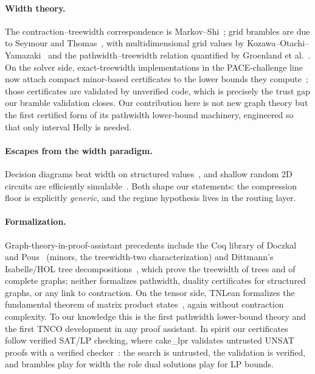 \documentclass[sigplan,10pt,screen,review,anonymous]{acmart}
\begin{document}
\paragraph{Width theory.} The contraction--treewidth correspondence is
Markov--Shi~\cite{markov2008simulating}; grid brambles are due to Seymour and
Thomas~\cite{seymour1993graph}, with multidimensional grid values by
Kozawa--Otachi--Yamazaki~\cite{kozawa2014treewidth} and the pathwidth--treewidth relation
quantified by Groenland et al.~\cite{groenland2023tight}. On the solver side, exact-treewidth
implementations in the PACE-challenge line now attach compact minor-based certificates to
the lower bounds they compute~\cite{tamaki2022heuristic}; those certificates are validated
by unverified code, which is precisely the trust gap our bramble validation closes. Our
contribution here is not new graph theory but the first certified form of its
pathwidth lower-bound machinery, engineered so that only interval Helly is
needed.

\paragraph{Escapes from the width paradigm.} Decision diagrams beat width on structured
values~\cite{dd2025treewidth}, and shallow random 2D circuits are efficiently
simulable~\cite{napp2022efficient}. Both shape our statements: the compression floor is
explicitly \emph{generic}, and the regime hypothesis lives in the routing layer.

\paragraph{Formalization.} Graph-theory-in-proof-assistant precedents include the Coq
library of Doczkal and Pous~\cite{doczkal2020graph} (minors, the treewidth-two
characterization) and Dittmann's Isabelle/HOL tree decompositions~\cite{dittmann2016tree},
which prove the treewidth of trees and of complete graphs; neither formalizes pathwidth,
duality certificates for structured graphs, or any link to contraction. On the tensor
side, TNLean formalizes the fundamental theorem of matrix product states~\cite{tnlean2026},
again without contraction complexity. To our knowledge this is the first pathwidth
lower-bound theory and the first TNCO development in any proof assistant. In spirit our
certificates follow verified SAT/LP checking, where cake\_lpr validates untrusted UNSAT
proofs with a verified checker~\cite{tan2021cakelpr}: the search is untrusted, the
validation is verified, and brambles play for width the role dual solutions play for LP
bounds.
\end{document}
